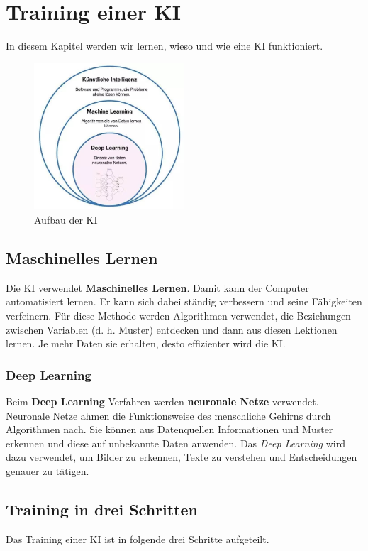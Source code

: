 \chapter{Training einer KI}
\label{chap:training}

In diesem Kapitel werden wir lernen, wieso und wie eine KI funktioniert.

\begin{figure}[h]
    \centering
    \includegraphics[width=0.5\textwidth]{ki-aufbau.jpg}
    \caption{Aufbau der KI}
    \label{fig:ki-aufbau}
\end{figure}

\section{Maschinelles Lernen}
Die KI verwendet \textbf{Maschinelles Lernen}. Damit kann der Computer automatisiert lernen. Er kann sich dabei ständig verbessern und seine Fähigkeiten verfeinern.
Für diese Methode werden Algorithmen verwendet, die Beziehungen zwischen Variablen (d. h. Muster) entdecken und dann aus diesen Lektionen lernen. Je mehr Daten sie erhalten, desto effizienter wird die KI.

\subsection{Deep Learning}
Beim \textbf{Deep Learning}-Verfahren werden \textbf{neuronale Netze} verwendet.
Neuronale Netze ahmen die Funktionsweise des menschliche Gehirns durch Algorithmen nach. Sie können aus Datenquellen Informationen und Muster erkennen und diese auf unbekannte Daten anwenden.
Das \textit{Deep Learning} wird dazu verwendet, um Bilder zu erkennen, Texte zu verstehen und Entscheidungen genauer zu tätigen.

\section{Training in drei Schritten}
Das Training einer KI ist in folgende drei Schritte aufgeteilt.

